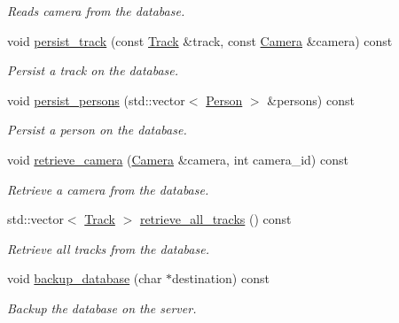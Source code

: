 \begin{DoxyCompactItemize}
\begin{DoxyCompactList}\small\item\em Reads camera from the database. \end{DoxyCompactList}\item 
\mbox{\label{classdto_1_1_s_q_l_helper_ad3ee0bd0880c907ddac395986fb1717f}} 
void \mbox{\hyperlink{classdto_1_1_s_q_l_helper_ad3ee0bd0880c907ddac395986fb1717f}{persist\+\_\+track}} (const \mbox{\hyperlink{structdto_1_1_track}{Track}} \&track, const \mbox{\hyperlink{structdto_1_1_camera}{Camera}} \&camera) const
\begin{DoxyCompactList}\small\item\em Persist a track on the database. \end{DoxyCompactList}\item 
\mbox{\label{classdto_1_1_s_q_l_helper_a037a60754c739a9ea590db94200eea50}} 
void \mbox{\hyperlink{classdto_1_1_s_q_l_helper_a037a60754c739a9ea590db94200eea50}{persist\+\_\+persons}} (std\+::vector$<$ \mbox{\hyperlink{structdto_1_1_person}{Person}} $>$ \&persons) const
\begin{DoxyCompactList}\small\item\em Persist a person on the database. \end{DoxyCompactList}\item 
\mbox{\label{classdto_1_1_s_q_l_helper_ab0ab43a22bcbe59e1df275fae03c2096}} 
void \mbox{\hyperlink{classdto_1_1_s_q_l_helper_ab0ab43a22bcbe59e1df275fae03c2096}{retrieve\+\_\+camera}} (\mbox{\hyperlink{structdto_1_1_camera}{Camera}} \&camera, int camera\+\_\+id) const
\begin{DoxyCompactList}\small\item\em Retrieve a camera from the database. \end{DoxyCompactList}\item 
\mbox{\label{classdto_1_1_s_q_l_helper_a8777e3aafd44fe6e407493eb3c74e1ad}} 
std\+::vector$<$ \mbox{\hyperlink{structdto_1_1_track}{Track}} $>$ \mbox{\hyperlink{classdto_1_1_s_q_l_helper_a8777e3aafd44fe6e407493eb3c74e1ad}{retrieve\+\_\+all\+\_\+tracks}} () const
\begin{DoxyCompactList}\small\item\em Retrieve all tracks from the database. \end{DoxyCompactList}\item 
\mbox{\label{classdto_1_1_s_q_l_helper_a43c91039b128818753081f9c7a5803c1}} 
void \mbox{\hyperlink{classdto_1_1_s_q_l_helper_a43c91039b128818753081f9c7a5803c1}{backup\+\_\+database}} (char $\ast$destination) const
\begin{DoxyCompactList}\small\item\em Backup the database on the server. \end{DoxyCompactList}\end{DoxyCompactItemize}


